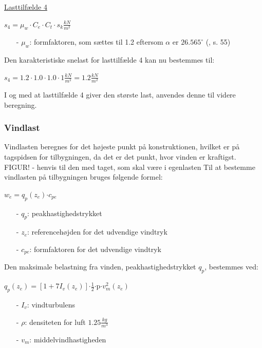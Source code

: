 \underline{Lasttilfælde 4}
\begin{center}
	$s_4=\mu_w\cdot C_e\cdot C_t\cdot s_k \frac{kN}{m^2}$
\end{center}
\begin{itemize}
	\item[-] $\mu_w$: formfaktoren, som sættes til 1.2 eftersom $\alpha$ er $26.565^{\circ}$ (\citep{EU91}, s. 55)
\end{itemize}
Den karakteristiske snelast for lasttilfælde 4 kan nu bestemmes til:
\begin{center}
	$s_4=1.2\cdot 1.0\cdot 1.0\cdot 1 \frac{kN}{m^2}=1.2 \frac{kN}{m^2}$
\end{center}
I og med at lasttilfælde 4 giver den største last, anvendes denne til videre beregning.

\subsubsection{Vindlast}
Vindlasten beregnes for det højeste punkt på konstruktionen, hvilket er på tagspidsen for tilbygningen, da det er det punkt, hvor vinden er kraftigst.
\newline
\newline
FIGUR! - henvis til den med taget, som skal være i egenlasten
\newline
\newline
Til at bestemme vindlasten på tilbygningen bruges følgende formel:	
\begin{center} $w_e=q_p(z_e)$$\cdot$$c_{pe}$
\end{center}
\begin{itemize}
	\item[-] $q_p$: peakhastighedstrykket
	\item[-] $z_e$: referencehøjden for det udvendige vindtryk
	\item[-] $c_{pe}$: formfaktoren for det udvendige vindtryk
\end{itemize}
Den maksimale belastning fra vinden, peakhastighedstrykket $q_p$, bestemmes ved:
\begin{center}
$q_p(z_e)=[1+7I_v(z_e)]$$\cdot$$\frac{1}{2}$$\cdot$p$\cdot$$v_m^2(z_e)$
\end{center}
\begin{itemize}
	\item[-] $I_v$: vindturbulens
	\item[-] $\rho$: densiteten for luft $1.25 \frac{kg}{m^3}$
	\item[-] $v_m$: middelvindhastigheden
\end{itemize}
